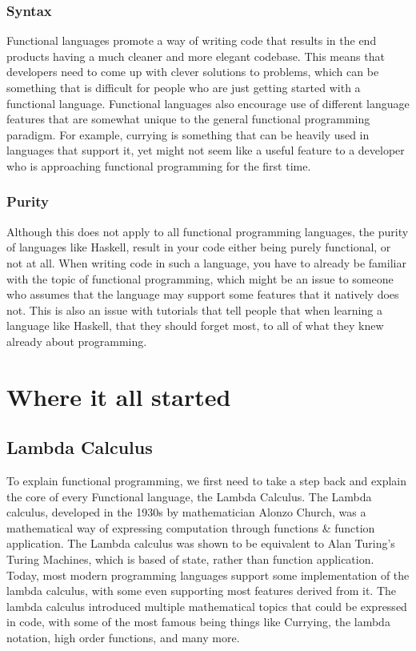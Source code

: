 \documentclass{report}
\begin{document}
\subsubsection{Syntax}
Functional languages promote a way of writing code that results in the end products having a much cleaner and more elegant codebase. This means that developers need to come up with clever solutions to problems, which can be something that is difficult for people who are just getting started with a functional language. Functional languages also encourage use of different language features that are somewhat unique to the general functional programming paradigm. For example, currying is something that can be heavily used in languages that support it, yet might not seem like a useful feature to a developer who is approaching functional programming for the first time.
\subsubsection{Purity}
Although this does not apply to all functional programming languages, the purity of languages like Haskell, result in your code either being purely functional, or not at all. When writing code in such a language, you have to already be familiar with the topic of functional programming, which might be an issue to someone who assumes that the language may support some features that it natively does not. This is also an issue with tutorials that tell people that when learning a language like Haskell, that they should forget most, to all of what they knew already about programming.
\section{Where it all started}
\subsection{Lambda Calculus}
To explain functional programming, we first need to take a step back and explain the core of every Functional language, the Lambda Calculus. The Lambda calculus, developed in the 1930s by mathematician Alonzo Church, was a mathematical way of expressing computation through functions \& function application. The Lambda calculus was shown to be equivalent to Alan Turing's Turing Machines, which is based of state, rather than function application.
Today, most modern programming languages support some implementation of the lambda calculus, with some even supporting most features derived from it.
The lambda calculus introduced multiple mathematical topics that could be expressed in code, with some of the most famous being things like Currying, the lambda notation, high order functions, and many more.
\end{document}
